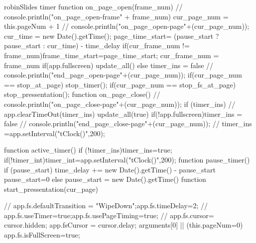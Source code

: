 \begin{insDLJS}{robin}{Slides timer}
	function on_page_open(frame_num) {	
		// console.println("on_page_open-frame" + frame_num)
		cur_page_num = this.pageNum + 1
		// console.println("on_page_open-page"+(cur_page_num));	
    cur_time = new Date().getTime();
		page_time_start= (pause_start ? pause_start : cur_time) - time_delay
		if(cur_frame_num != frame_num)frame_time_start=page_time_start;		
		cur_frame_num = frame_num
		if(app.fullscreen){
			update_all()
		} else {
			timer_ins = false
		}
		// console.println("end_page_open-page"+(cur_page_num));	
    if(cur_page_num == stop_at_page) stop_timer();
    if(cur_page_num == stop_fs_at_page) stop_pressentation();
	}
	function on_page_close() {
		// console.println("on_page_close-page"+(cur_page_num));
		if (timer_ins) {
			// app.clearTimeOut(timer_ins)
			update_all(true)
			if(!app.fullscreen)timer_ins = false
		}
		// console.println("end_page_close-page"+(cur_page_num));
	}
	// timer_ins =app.setInterval("tClock()",200);
	
	function active_timer() {
		if (!timer_ins){timer_ins=true};
		if(!timer_int)timer_int=app.setInterval("tClock()",200);
	}
  function pause_timer() {
    if (pause_start) {
      time_delay += new Date().getTime() - pause_start
      pause_start=0
    } else {
      pause_start = new Date().getTime()
    }
  }
	function start_pressentation(cur_page){
		// app.fs.defaultTransition = "WipeDown";app.fs.timeDelay=2;
		// app.fs.useTimer=true;app.fs.usePageTiming=true;
		// app.fs.cursor= cursor.hidden;
    app.fsCursor = cursor.delay;
    arguments[0] || (this.pageNum=0)
    app.fs.isFullScreen=true;

}
\end{insDLJS}

